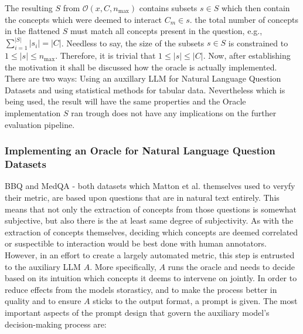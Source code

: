The resulting $S$ from $\mathcal{O}(x, C, n_{\max})$ contains subsets $s \in S$ which then contain the concepts which were deemed to interact $C_m \in s$. the total number of concepts in the flattened $S$ must match all concepts present in the question, e.g., $\sum_{i=1}^{\lvert S \rvert} \lvert s_i \rvert = \lvert C \rvert$. Needless to say, the size of the subsets $s \in S$ is constrained to $1 \le \lvert s \rvert \le n_{\max}$. Therefore, it is trivial that $1 \le \lvert s \rvert \le \lvert C \rvert$. Now, after establishing the motivation it shall be discussed how the oracle is actually implemented. There are two ways: Using an auxillary LLM for Natural Language Question Datasets and using statistical methods for tabular data. Nevertheless which is being used, the result will have the same properties and the Oracle implementation $S$ ran trough does not have any implications on the further evaluation pipeline.

\subsubsection{Implementing an Oracle for Natural Language Question Datasets}
BBQ and MedQA - both datasets which Matton et al. themselves used to veryfy their metric, are based upon questions that are in natural text entirely. This means that not only the extraction of concepts from those questions is somewhat subjective, but also there is the at least same degree of subjectivity. As with the extraction of concepts themselves, deciding which concepts are deemed correlated or suspectible to interaction would be best done with human annotators. However, in an effort to create a largely automated metric, this step is entrusted to the auxiliary LLM $A$. More specifically, $A$ runs the oracle and needs to decide based on its intuition which concepts it deems to intervene on jointly. In order to reduce effects from the models storasticy, and to make the process better in quality and to ensure $A$ sticks to the output format, a prompt is given. The most important aspects of the prompt design that govern the auxiliary model's decision-making process are:

